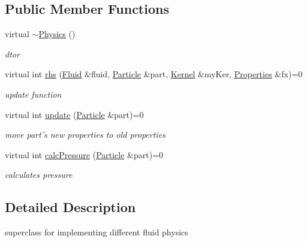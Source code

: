 \subsection*{\-Public \-Member \-Functions}
\begin{DoxyCompactItemize}
\item 
\hypertarget{classPhysics_afdd87b5bb9fe2e927c37d50fbeb8216b}{virtual \hyperlink{classPhysics_afdd87b5bb9fe2e927c37d50fbeb8216b}{$\sim$\-Physics} ()}\label{classPhysics_afdd87b5bb9fe2e927c37d50fbeb8216b}

\begin{DoxyCompactList}\small\item\em dtor \end{DoxyCompactList}\item 
virtual int \hyperlink{classPhysics_a0fd5afe65228da08e3886e58d5285d43}{rhs} (\hyperlink{classFluid}{\-Fluid} \&fluid, \hyperlink{classParticle}{\-Particle} \&part, \hyperlink{classKernel}{\-Kernel} \&my\-Ker, \hyperlink{structProperties}{\-Properties} \&fx)=0
\begin{DoxyCompactList}\small\item\em update function \end{DoxyCompactList}\item 
\hypertarget{classPhysics_ab51a11d51e09b132610cd6fbb95d0c0c}{virtual int \hyperlink{classPhysics_ab51a11d51e09b132610cd6fbb95d0c0c}{update} (\hyperlink{classParticle}{\-Particle} \&part)=0}\label{classPhysics_ab51a11d51e09b132610cd6fbb95d0c0c}

\begin{DoxyCompactList}\small\item\em move part's new properties to old properties \end{DoxyCompactList}\item 
\hypertarget{classPhysics_a50759e0407dff12021c94f9fa6729765}{virtual int \hyperlink{classPhysics_a50759e0407dff12021c94f9fa6729765}{calc\-Pressure} (\hyperlink{classParticle}{\-Particle} \&part)=0}\label{classPhysics_a50759e0407dff12021c94f9fa6729765}

\begin{DoxyCompactList}\small\item\em calculates pressure \end{DoxyCompactList}\end{DoxyCompactItemize}


\subsection{\-Detailed \-Description}
superclass for implementing different fluid physics 

